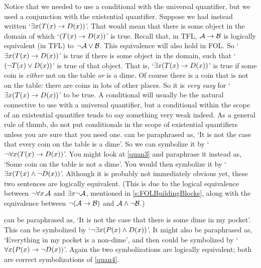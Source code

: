 Notice that we needed to use a conditional with the universal quantifier, but we used a conjunction with the existential quantifier. Suppose we had instead written `$\exists x(T(x) \rightarrow D(x))$'. That would mean that there is some object in the domain of which `$(T(x) \rightarrow D(x))$' is true. Recall that, in TFL, $\mathcal{A} \rightarrow \mathcal{B}$ is logically equivalent (in TFL) to $\neg\mathcal{A} \vee \mathcal{B}$. This equivalence will also hold in FOL. So `$\exists x(T(x) \rightarrow D(x))$' is true if there is some object in the domain, such that `$(\neg T(x) \vee D(x))$' is true of that object. That is, `$\exists x (T(x) \rightarrow D(x))$' is true if some coin is \emph{either} not on the table \emph{or} is a dime. Of course there is a coin that is not on the table: there are coins in  lots of other places. So it is \emph{very easy} for `$\exists x(T(x) \rightarrow D(x))$' to be true. A conditional will usually be the natural connective to use with a universal quantifier, but a conditional within the scope of an existential quantifier tends to say something very weak indeed. As a general rule of thumb, do not put conditionals in the scope of existential quantifiers unless you are sure that you need one.
 can be paraphrased as, `It is not the case that every coin on the table is a dime'. So we can symbolize it by `$\neg \forall x(T(x) \rightarrow D(x))$'. You might look at \cref*{quan3} and paraphrase it instead as, `Some coin on the table is not a dime'. You would then symbolize it by `$\exists x(T(x) \wedge \neg D(x))$'. Although it is probably not immediately obvious yet, these two sentences are logically equivalent. (This is due to the logical equivalence between $\neg\forall x\,\mathcal{A}$ and $\exists x\neg\mathcal{A}$, mentioned in \cref{s:FOLBuildingBlocks}, along with the equivalence between $\neg(\mathcal{A}\rightarrow\mathcal{B})$ and $\mathcal{A}\wedge\neg\mathcal{B}$.)

 can be paraphrased as, `It is not the case that there is some dime in my pocket'. This can be symbolized by `$\neg\exists x(P(x) \wedge D(x))$'. It might also be paraphrased as, `Everything in my pocket is a non-dime', and then could be symbolized by `$\forall x(P(x) \rightarrow \neg D(x))$'. Again the two symbolizations are logically equivalent; both are correct symbolizations of \cref*{quan4}.

